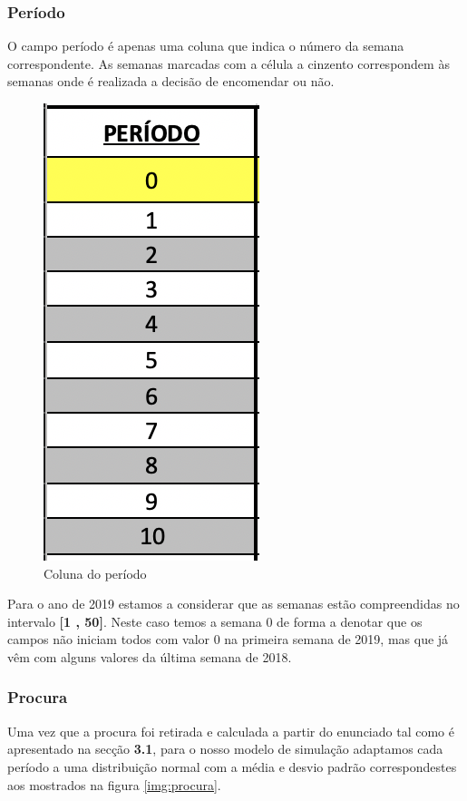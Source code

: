 \documentclass[a4paper]{article}
\begin{document}
\subsubsection{Período}

O campo período é apenas uma coluna que indica o número da semana correspondente. As semanas marcadas com a célula a cinzento correspondem às semanas onde é realizada a decisão de encomendar ou não.

\begin{figure}[H]
\centering
\includegraphics[scale=0.6]{periodo.png}
\caption{Coluna do período}
\label{img:periodo}
\end{figure}

Para o ano de 2019 estamos a considerar que as semanas estão compreendidas no intervalo \textbf{[1 , 50]}. Neste caso temos a semana 0 de forma a denotar que os campos não iniciam todos com valor 0 na primeira semana de 2019, mas que já vêm com alguns valores da última semana de 2018.


\subsubsection{Procura}

Uma vez que a procura foi retirada e calculada a partir do enunciado tal como é apresentado na secção \textbf{3.1}, para o nosso modelo de simulação adaptamos cada período a uma distribuição normal com a média e desvio padrão correspondestes aos mostrados na figura \ref{img:procura}.
\end{document}
